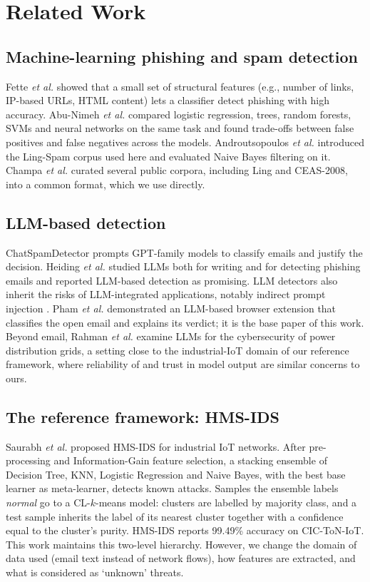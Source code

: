 \documentclass[conference]{IEEEtran}
\begin{document}
\section{Related Work}
\subsection{Machine-learning phishing and spam detection}
Fette \emph{et al.} \cite{fette2007learning} showed that a small set of structural features (e.g., number of links, IP-based URLs, HTML content) lets a classifier detect phishing with high accuracy. Abu-Nimeh \emph{et al.} \cite{abunimeh2007comparison} compared logistic regression, trees, random forests, SVMs and neural networks on the same task and found trade-offs between false positives and false negatives across the models. Androutsopoulos \emph{et al.} \cite{androutsopoulos2000lingspam} introduced the Ling-Spam corpus used here and evaluated Naive Bayes filtering on it. Champa \emph{et al.} \cite{champa2024curated,champa2023zenodo} curated several public corpora, including Ling and CEAS-2008, into a common format, which we use directly.

\subsection{LLM-based detection}
ChatSpamDetector \cite{koide2024chatspamdetector} prompts GPT-family models to classify emails and justify the decision. Heiding \emph{et al.} \cite{heiding2024devising} studied LLMs both for writing and for detecting phishing emails and reported LLM-based detection as promising. LLM detectors also inherit the risks of LLM-integrated applications, notably indirect prompt injection \cite{greshake2023indirect}. Pham \emph{et al.} \cite{pham2025demo} demonstrated an LLM-based browser extension that classifies the open email and explains its verdict; it is the base paper of this work. Beyond email, Rahman \emph{et al.} \cite{rahman2025grid} examine LLMs for the cybersecurity of power distribution grids, a setting close to the industrial-IoT domain of our reference framework, where reliability of and trust in model output are similar concerns to ours.

\subsection{The reference framework: HMS-IDS}
Saurabh \emph{et al.} \cite{saurabh2025hmsids} proposed HMS-IDS for industrial IoT networks. After pre-processing and Information-Gain feature selection, a stacking ensemble of Decision Tree, KNN, Logistic Regression and Naive Bayes, with the best base learner as meta-learner, detects known attacks. Samples the ensemble labels \emph{normal} go to a CL-$k$-means model: clusters are labelled by majority class, and a test sample inherits the label of its nearest cluster together with a confidence equal to the cluster's purity. HMS-IDS reports 99.49\% accuracy on CIC-ToN-IoT. This work maintains this two-level hierarchy. However, we change the domain of data used (email text instead of network flows), how features are extracted, and what is considered as `unknown' threats. 
\end{document}
